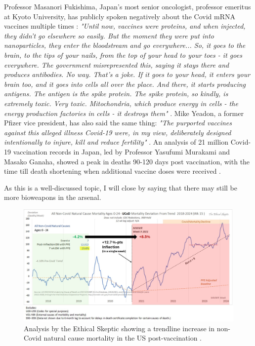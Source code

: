 \documentclass[10pt,twocolumn,letterpaper]{article}
\begin{document}
Professor Masanori Fukishima, Japan's most senior oncologist, professor emeritus at Kyoto University, has publicly spoken negatively about the Covid mRNA vaccines multiple times \cite{35,36}: \textit{"Until now, vaccines were proteins, and when injected, they didn't go elsewhere so easily. But the moment they were put into nanoparticles, they enter the bloodstream and go everywhere... So, it goes to the brain, to the tips of your nails, from the top of your head to your toes - it goes everywhere. The government misrepresented this, saying it stays there and produces antibodies. No way. That's a joke. If it goes to your head, it enters your brain too, and it goes into cells all over the place. And there, it starts producing antigens. The antigen is the spike protein. The spike protein, so kindly, is extremely toxic. Very toxic. Mitochondria, which produce energy in cells - the energy production factories in cells - it destroys them"} \cite{37,38}. Mike Yeadon, a former Pfizer vice president, has also said the same thing: \textit{"The purported vaccines against this alleged illness Covid-19 were, in my view, deliberately designed intentionally to injure, kill and reduce fertility"} \cite{39}. An analysis of 21 million Covid-19 vaccination records in Japan, led by Professor Yasufumi Murakami and Masako Ganaha, showed a peak in deaths 90-120 days post vaccination, with the time till death shortening when additional vaccine doses were received \cite{40,41}.

As this is a well-discussed topic, I will close by saying that there may still be more bioweapons in the arsenal.

\begin{figure}[t]
\begin{center}
\includegraphics[width=1\textwidth]{tes1.jpeg}
\end{center}
   \caption{Analysis by the Ethical Skeptic showing a trendline increase in non-Covid natural cause mortality in the US post-vaccination \cite{42}.}
   \label{fig:18}
\end{figure}
\end{document}
